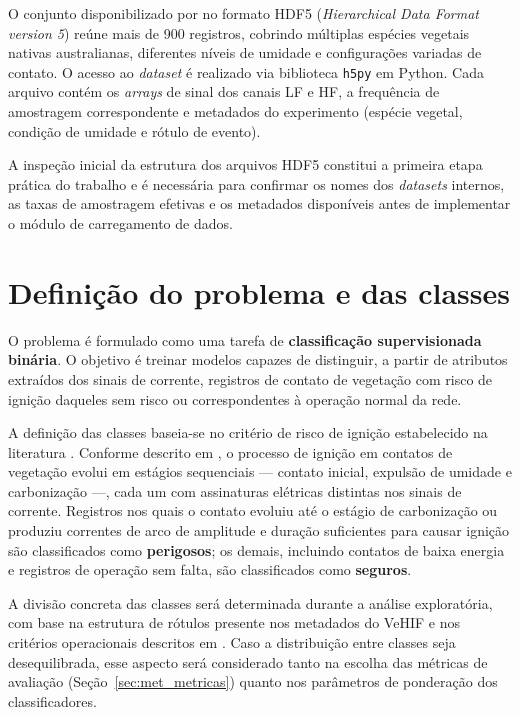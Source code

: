 O conjunto disponibilizado por  no formato HDF5 (\textit{Hierarchical Data Format version 5}) reúne mais de 900 registros, cobrindo múltiplas espécies vegetais nativas australianas, diferentes níveis de umidade e configurações variadas de contato. O acesso ao \textit{dataset} é realizado via biblioteca \texttt{h5py} em Python. Cada arquivo contém os \textit{arrays} de sinal dos canais LF e HF, a frequência de amostragem correspondente e metadados do experimento (espécie vegetal, condição de umidade e rótulo de evento).

A inspeção inicial da estrutura dos arquivos HDF5 constitui a primeira etapa prática do trabalho e é necessária para confirmar os nomes dos \textit{datasets} internos, as taxas de amostragem efetivas e os metadados disponíveis antes de implementar o módulo de carregamento de dados.

\section{Definição do problema e das classes}\label{sec:met_classes}

O problema é formulado como uma tarefa de \textbf{classificação supervisionada binária}. O objetivo é treinar modelos capazes de distinguir, a partir de atributos extraídos dos sinais de corrente, registros de contato de vegetação com risco de ignição daqueles sem risco ou correspondentes à operação normal da rede.

A definição das classes baseia-se no critério de risco de ignição estabelecido na literatura \cite{Ozansoy2020, 8}. Conforme descrito em , o processo de ignição em contatos de vegetação evolui em estágios sequenciais — contato inicial, expulsão de umidade e carbonização —, cada um com assinaturas elétricas distintas nos sinais de corrente. Registros nos quais o contato evoluiu até o estágio de carbonização ou produziu correntes de arco de amplitude e duração suficientes para causar ignição são classificados como \textbf{perigosos}; os demais, incluindo contatos de baixa energia e registros de operação sem falta, são classificados como \textbf{seguros}.

A divisão concreta das classes será determinada durante a análise exploratória, com base na estrutura de rótulos presente nos metadados do VeHIF e nos critérios operacionais descritos em . Caso a distribuição entre classes seja desequilibrada, esse aspecto será considerado tanto na escolha das métricas de avaliação (Seção~\ref{sec:met_metricas}) quanto nos parâmetros de ponderação dos classificadores.

